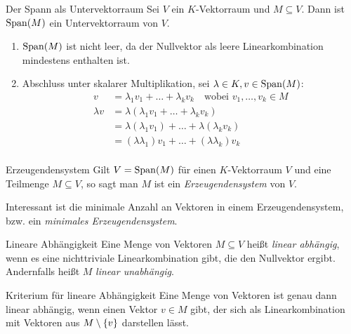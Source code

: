 \begin{satz}{Der Spann als Untervektorraum}
  Sei $V$ ein $K$-Vektorraum und $M\subseteq V$. Dann ist $\operatorname{Span}\! \left(M\right)$ ein Untervektorraum von $V$.
\end{satz}
\beweis
\begin{enumerate}
  \item $\operatorname{Span}\! \left(M\right)$ ist nicht leer, da der Nullvektor als leere Linearkombination mindestens enthalten ist.
  \item Abschluss unter skalarer Multiplikation, sei $\lambda \in K, v\in \operatorname{Span}\! \left(M\right)$:
  \begin{align*}
    v &= \lambda_1v_1+\ldots+\lambda_kv_k \quad\text{wobei } v_1,\ldots,v_k \in M\\
    \lambda v &= \lambda(\lambda_1v_1+\ldots+\lambda_kv_k)\\
    &= \lambda(\lambda_1v_1)+\ldots+\lambda(\lambda_kv_k)\\
    &= (\lambda\lambda_1)v_1+\ldots+(\lambda\lambda_k)v_k\\
  \end{align*}
\end{enumerate}


\begin{definition}{Erzeugendensystem}
	Gilt $V=\operatorname{Span}\! \left(M\right)$ für einen $K$-Vektorraum $V$ und eine Teilmenge $M\subseteq V$, so sagt man $M$ ist ein \emph{Erzeugendensystem} von $V$.
\end{definition}
Interessant ist die minimale Anzahl an Vektoren in einem Erzeugendensystem, bzw. ein \emph{minimales Erzeugendensystem}.

\begin{definition}{Lineare Abhängigkeit}\label{satz:lineareUnabhaengigkeit}
	Eine Menge von Vektoren $M\subseteq V$ heißt \emph{linear abhängig}, wenn es eine nichttriviale Linearkombination gibt, die den Nullvektor ergibt. Andernfalls heißt $M$ \emph{linear unabhängig}.
\end{definition}


\begin{satz}{Kriterium für lineare Abhängigkeit}
  Eine Menge von Vektoren ist genau dann linear abhängig, wenn einen Vektor $v\in M$ gibt, der sich als Linearkombination mit Vektoren aus $M\setminus\left\{ v \right\}$ darstellen lässt.
\end{satz}


